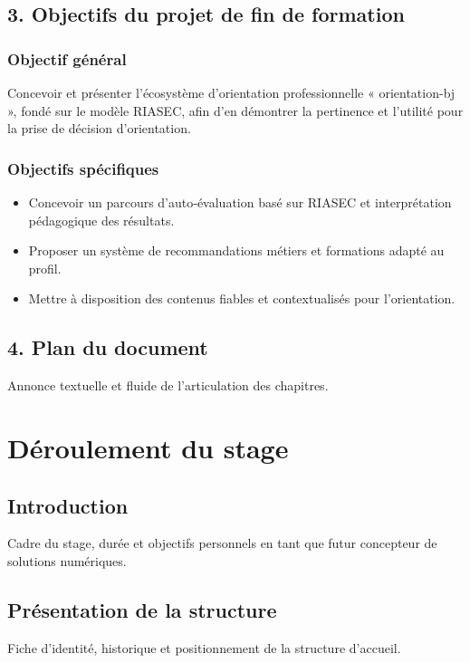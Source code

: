 \documentclass[12pt,a4paper]{report}
\begin{document}
\section*{3. Objectifs du projet de fin de formation}
\subsection*{Objectif général}
Concevoir et présenter l’écosystème d’orientation professionnelle « orientation-bj », fondé sur le modèle RIASEC, afin d’en démontrer la pertinence et l’utilité pour la prise de décision d’orientation.

\subsection*{Objectifs spécifiques}
\begin{itemize}
    \item Concevoir un parcours d’auto‑évaluation basé sur RIASEC et interprétation pédagogique des résultats.
    \item Proposer un système de recommandations métiers et formations adapté au profil.
    \item Mettre à disposition des contenus fiables et contextualisés pour l’orientation.
\end{itemize}

\section*{4. Plan du document}
Annonce textuelle et fluide de l’articulation des chapitres.

\newpage

\chapter{Déroulement du stage}

\section{Introduction}
Cadre du stage, durée et objectifs personnels en tant que futur concepteur de solutions numériques.

\section{Présentation de la structure}
Fiche d’identité, historique et positionnement de la structure d’accueil.
\end{document}

